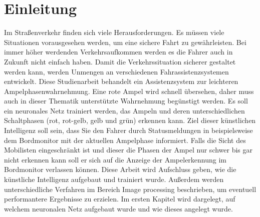 \documentclass[a4paper,oneside,12pt]{report}
\begin{document}
	
	
	\tableofcontents
	\cleardoublepage
	
	
	\chapter*{Einleitung}
	\begin{onehalfspace}
		Im Straßenverkehr finden sich viele Herausforderungen. Es müssen viele Situationen vorausgesehen werden, um eine sichere Fahrt zu gewährleisten. Bei immer höher werdenden Verkehrsaufkommen werden es die Fahrer auch in Zukunft nicht einfach haben. Damit die Verkehrssituation sicherer gestaltet werden kann, werden Unmengen an verschiedenen Fahrassistenzsystemen entwickelt. Diese Studienarbeit behandelt ein Assistenzsystem zur leichteren Ampelphasenwahrnehmung. Eine rote Ampel wird schnell übersehen, daher muss auch in dieser Thematik unterstützte Wahrnehmung begünstigt werden. Es soll ein neuronales Netz trainiert werden, das Ampeln und deren unterschiedlichen Schaltphasen (rot, rot-gelb, gelb und grün) erkennen kann. Ziel dieser künstlichen Intelligenz soll sein, dass Sie den Fahrer durch Statusmeldungen in beispielsweise dem Bordmonitor mit der aktuellen Ampelphase informiert. Falls die Sicht des Mobilisten eingeschränkt ist und dieser die Phasen der Ampel nur schwer bis gar nicht erkennen kann soll er sich auf die Anzeige der Ampelerkennung im Bordmonitor verlassen können. Diese Arbeit wird Aufschluss geben, wie die künstliche Intelligenz aufgebaut und trainiert wurde. Außerdem werden unterschiedliche Verfahren im Bereich Image processing beschrieben, um eventuell performantere Ergebnisse zu erzielen. Im ersten Kapitel wird dargelegt, auf welchem neuronalen Netz aufgebaut wurde und wie dieses angelegt wurde.
	\end{onehalfspace}
\end{document}
